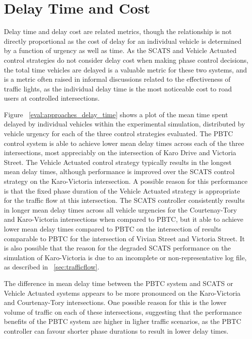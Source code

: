 \section {Delay Time and Cost}
\label{sec:incurred_delay_cost}

Delay time and delay cost are related metrics, though the relationship is not directly proportional as the cost of delay for an individual vehicle is determined by a function of urgency as well as time. As the SCATS and Vehicle Actuated control strategies do not consider delay cost when making phase control decisions, the total time vehicles are delayed is a valuable metric for these two systems, and is a metric often raised in informal discussions related to the effectiveness of traffic lights, as the individual delay time is the most noticeable cost to road users at controlled intersections.

Figure ~\ref{eval:approaches_delay_time} shows a plot of the mean time spent delayed by individual vehicles within the experimental simulation, distributed by vehicle urgency for each of the three control strategies evaluated. The PBTC control system is able to achieve lower mean delay times across each of the three intersections, most appreciably on the intersection of Karo Drive and Victoria Street. The Vehicle Actuated control strategy typically results in the longest mean delay times, although performance is improved over the SCATS control strategy on the Karo-Victoria intersection. A possible reason for this performance is that the fixed phase duration of the Vehicle Actuated strategy is appropriate for the traffic flow at this intersection. The SCATS controller consistently results in longer mean delay times across all vehicle urgencies for the Courtenay-Tory and Karo-Victoria intersections when compared to PBTC, but it able to achieve lower mean delay times compared to PBTC on the intersection of results comparable to PBTC for the intersection of Vivian Street and Victoria Street. It is also possible that the reason for the degraded SCATS performance on the simulation of Karo-Victoria is due to an incomplete or non-representative log file, as described in ~\ref{sec:trafficflow}. 

The difference in mean delay time between the PBTC system and SCATS or Vehicle Actuated systems appears to be more pronounced on the Karo-Victoria and Courtenay-Tory intersections. One possible reason for this is the lower volume of traffic on each of these intersections, suggesting that the performance benefits of the PBTC system are higher in ligher traffic scenarios, as the PBTC controller can favour shorter phase durations to result in lower delay times. 

